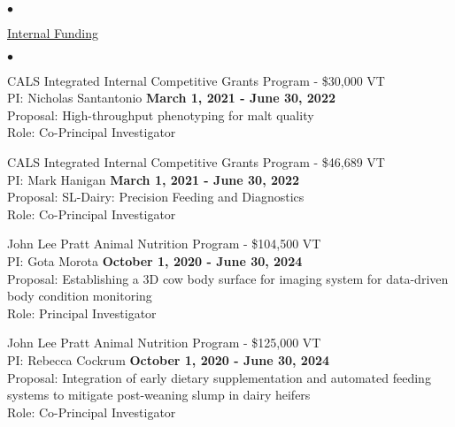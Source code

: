\documentclass[margin,line,10pt]{res}
\newenvironment{list2}{
  \begin{list}{$\bullet$}{%
      \setlength{\itemsep}{0in}
      \setlength{\parsep}{0in} \setlength{\parskip}{0in}
      \setlength{\topsep}{0in} \setlength{\partopsep}{0in} 
      \setlength{\leftmargin}{0.2in}}}{\end{list}}
\begin{document}
\begin{resume}
\begin{list2}
\end{list2}




\begin{flushleft}
\hspace{0.2cm} \underline{Internal Funding}
\end{flushleft}
\begin{list2}

  \item CALS Integrated Internal Competitive Grants Program  - \$30,000  \hfill VT\\
PI: Nicholas Santantonio \hfill \textbf{March 1, 2021 - June 30, 2022}\\
Proposal: High-throughput phenotyping for malt quality\\
Role: Co-Principal Investigator \\

\vspace{0.5cm}


 \item CALS Integrated Internal Competitive Grants Program  - \$46,689  \hfill VT\\
PI: Mark Hanigan \hfill \textbf{March 1, 2021 - June 30, 2022}\\
Proposal: SL-Dairy: Precision Feeding and Diagnostics\\
Role: Co-Principal Investigator \\


\vspace{0.5cm}

\item John Lee Pratt Animal Nutrition Program - \$104,500  \hfill VT\\
PI: Gota Morota \hfill \textbf{October 1, 2020 - June 30, 2024}\\
Proposal: Establishing a 3D cow body surface for imaging system for data-driven body condition monitoring\\
Role: Principal Investigator \\


\vspace{0.5cm}


\item John Lee Pratt Animal Nutrition Program - \$125,000  \hfill VT\\
PI: Rebecca Cockrum \hfill \textbf{October 1, 2020 - June 30, 2024}\\
Proposal: Integration of early dietary supplementation and automated feeding systems to mitigate post-weaning slump in dairy heifers\\
Role: Co-Principal Investigator \\


\end{list2}
\end{resume}
\end{document}
